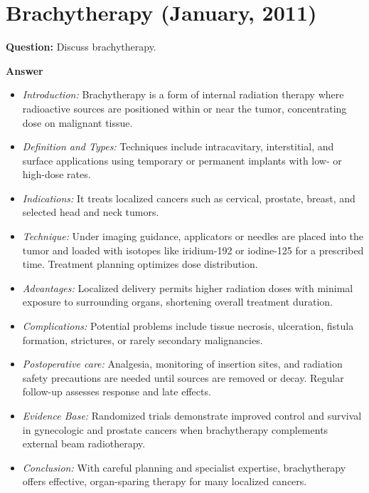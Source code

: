 \documentclass{article}
\begin{document}
\section{Brachytherapy (January, 2011)}

\textbf{Question:} Discuss brachytherapy.

\textbf{Answer}
\begin{itemize}

\item \emph{Introduction:} Brachytherapy is a form of internal radiation therapy where radioactive sources are positioned within or near the tumor, concentrating dose on malignant tissue.

\item \emph{Definition and Types:} Techniques include intracavitary, interstitial, and surface applications using temporary or permanent implants with low- or high-dose rates.

\item \emph{Indications:} It treats localized cancers such as cervical, prostate, breast, and selected head and neck tumors.

\item \emph{Technique:} Under imaging guidance, applicators or needles are placed into the tumor and loaded with isotopes like iridium-192 or iodine-125 for a prescribed time. Treatment planning optimizes dose distribution.

\item \emph{Advantages:} Localized delivery permits higher radiation doses with minimal exposure to surrounding organs, shortening overall treatment duration.

\item \emph{Complications:} Potential problems include tissue necrosis, ulceration, fistula formation, strictures, or rarely secondary malignancies.

\item \emph{Postoperative care:} Analgesia, monitoring of insertion sites, and radiation safety precautions are needed until sources are removed or decay. Regular follow-up assesses response and late effects.

\item \emph{Evidence Base:} Randomized trials demonstrate improved control and survival in gynecologic and prostate cancers when brachytherapy complements external beam radiotherapy.

\item \emph{Conclusion:} With careful planning and specialist expertise, brachytherapy offers effective, organ-sparing therapy for many localized cancers.

\end{itemize}
\end{document}
